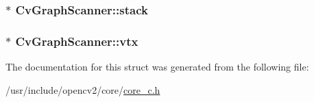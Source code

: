 \hypertarget{structCvGraphScanner_ab48c73ca35401a92cbcf479277642bc6}{
\subsubsection[{stack}]{$\ast$ Cv\-Graph\-Scanner\-::stack}}\label{structCvGraphScanner_ab48c73ca35401a92cbcf479277642bc6}
\hypertarget{structCvGraphScanner_ad80ad454de5201cefa11d83bc533f798}{
\subsubsection[{vtx}]{$\ast$ Cv\-Graph\-Scanner\-::vtx}}\label{structCvGraphScanner_ad80ad454de5201cefa11d83bc533f798}


The documentation for this struct was generated from the following file\-:\begin{DoxyCompactItemize}
\item 
/usr/include/opencv2/core/\hyperlink{core__c_8h}{core\-\_\-c.\-h}\end{DoxyCompactItemize}
